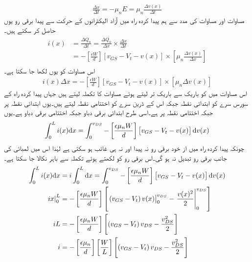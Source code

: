 \begin{align} \label{مساوات_میدانی_الیکٹران_کی_رفتار}
\frac{\Delta x}{\Delta t}=-\mu_n E=\mu_n \frac{\Delta v(x)}{\Delta t}
\end{align}
مساوات   اور مساوات   کی مدد سے ہم پیدا کردہ راہ میں آزاد الیکٹرانوں کے حرکت سے پیدا برقی رو یوں حاصل کر سکتے ہیں۔
\begin{gather}
\begin{aligned}
i(x)&=\frac{\Delta Q_n}{\Delta t}=\frac{\Delta Q_n}{\Delta x} \times \frac{\Delta x}{\Delta t}\\
&=-\left[\frac{\epsilon W}{d} \right ] \left[v_{GS}-V_t-v(x) \right ] \times \left [\mu_n \frac{\Delta v(x)}{\Delta x} \right ]
\end{aligned}
\end{gather}
اس مساوات کو یوں لکھا جا سکتا ہے۔
\begin{align}
i(x) \Delta x=-\left[\frac{\epsilon W}{d} \right ] \left[v_{GS}-V_t -v(x) \right] \times \left[\mu_n \Delta v(x) \right ]
\end{align}
اس مساوات میں  کو باریک سے باریک تر لیتے ہوئے مساوات کا تکملہ لیتے ہیں جہاں پیدا کردہ راہ کے سورس سرے کو ابتدائی نقطہ جبکہ اس کے ڈرین سرے کو اختتامی نقطہ لیتے ہیں۔یوں ابتدائی نقطہ پر    جبکہ اختتامی نقطہ پر   ہے۔اسی طرح ابتدائی برقی دباو   جبکہ اختتامی برقی دباو   ہے۔یوں
\begin{align}
\int_0^{L} {i(x)} \textup{d}x=\int_0^{v_{DS}}-\left[\frac{\epsilon \mu_n W}{d} \right ] \left[v_{GS}-V_t-v(x) \right ] \textup{d}v(x)
\end{align}
چونکہ پیدا کردہ راہ میں از خود برقی رو نہ پیدا اور نہ ہی غائب ہو سکتی ہے لہٰذا اس میں لمبائی کی جانب برقی رو تبدیل نہ ہو گی۔اس برقی رو کو  لکھتے ہوئے تکملہ سے باہر نکالا جا سکتا ہے۔
\begin{gather}
\begin{aligned}
\int_0^{L} {i(x) \textup{d}x}&=i \int_0^{L} {\textup{d}x}=\int_0^{v_{DS}}-\left[\frac{\epsilon \mu_n W}{d} \right ] \left[v_{GS}-V_t-v(x) \right ] \textup{d}v(x)\\
\left. ix \right |_0^{L}&=-\left[\frac{\epsilon \mu_n W}{d} \right ] \left [ \left . \left ( v_{GS} -V_t \right )v(x) \right |_0^{v_{DS}} -\left . \frac{v(x)^2}{2}  \right |_0^{v_{DS}}\right ]
\\
iL&=-\left[\frac{\epsilon \mu_n W}{d} \right ] \left[\left(v_{GS}-V_t \right ) v_{DS}-\frac{v_{DS}^{2}}{2} \right ]\\
i&=-\left[\frac{\epsilon \mu_n}{d} \right ] \left[\frac{W}{L} \right ] \left[ \left(v_{GS}-V_t \right ) v_{DS}-\frac{v_{DS}^{2}}{2}\right ]
\end{aligned}
\end{gather}
